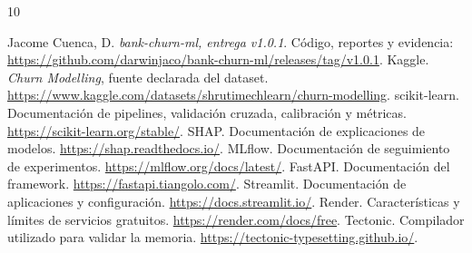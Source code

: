 \documentclass[11pt,a4paper,oneside]{report}
\begin{document}
\begin{thebibliography}{10}
 Jacome Cuenca, D. \textit{bank-churn-ml, entrega v1.0.1}.
Código, reportes y evidencia: \url{https://github.com/darwinjaco/bank-churn-ml/releases/tag/v1.0.1}.
 Kaggle. \textit{Churn Modelling}, fuente declarada del dataset.
\url{https://www.kaggle.com/datasets/shrutimechlearn/churn-modelling}.
 scikit-learn. Documentación de pipelines, validación cruzada,
calibración y métricas. \url{https://scikit-learn.org/stable/}.
 SHAP. Documentación de explicaciones de modelos.
\url{https://shap.readthedocs.io/}.
 MLflow. Documentación de seguimiento de experimentos.
\url{https://mlflow.org/docs/latest/}.
 FastAPI. Documentación del framework.
\url{https://fastapi.tiangolo.com/}.
 Streamlit. Documentación de aplicaciones y configuración.
\url{https://docs.streamlit.io/}.
 Render. Características y límites de servicios gratuitos.
\url{https://render.com/docs/free}.
 Tectonic. Compilador utilizado para validar la memoria.
\url{https://tectonic-typesetting.github.io/}.
\end{thebibliography}
\end{document}
